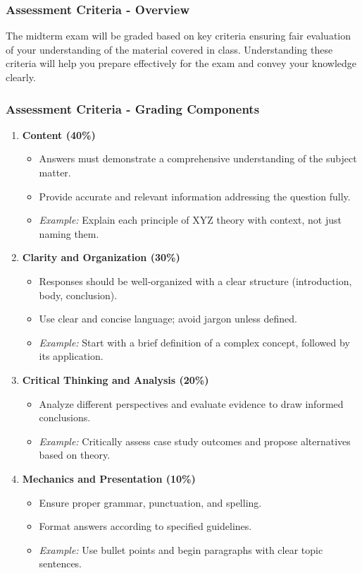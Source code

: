\documentclass[aspectratio=169]{beamer}
\begin{document}
\begin{frame}[fragile]
    \frametitle{Assessment Criteria - Overview}
    The midterm exam will be graded based on key criteria ensuring fair evaluation of your understanding of the material covered in class. Understanding these criteria will help you prepare effectively for the exam and convey your knowledge clearly.
\end{frame}

\begin{frame}[fragile]
    \frametitle{Assessment Criteria - Grading Components}
    \begin{enumerate}
        \item \textbf{Content (40\%)} 
        \begin{itemize}
            \item Answers must demonstrate a comprehensive understanding of the subject matter.
            \item Provide accurate and relevant information addressing the question fully.
            \item \textit{Example:} Explain each principle of XYZ theory with context, not just naming them.
        \end{itemize}
        
        \item \textbf{Clarity and Organization (30\%)} 
        \begin{itemize}
            \item Responses should be well-organized with a clear structure (introduction, body, conclusion).
            \item Use clear and concise language; avoid jargon unless defined.
            \item \textit{Example:} Start with a brief definition of a complex concept, followed by its application.
        \end{itemize}

        \item \textbf{Critical Thinking and Analysis (20\%)} 
        \begin{itemize}
            \item Analyze different perspectives and evaluate evidence to draw informed conclusions.
            \item \textit{Example:} Critically assess case study outcomes and propose alternatives based on theory.
        \end{itemize}

        \item \textbf{Mechanics and Presentation (10\%)} 
        \begin{itemize}
            \item Ensure proper grammar, punctuation, and spelling.
            \item Format answers according to specified guidelines.
            \item \textit{Example:} Use bullet points and begin paragraphs with clear topic sentences.
        \end{itemize}
    \end{enumerate}
\end{frame}
\end{document}
